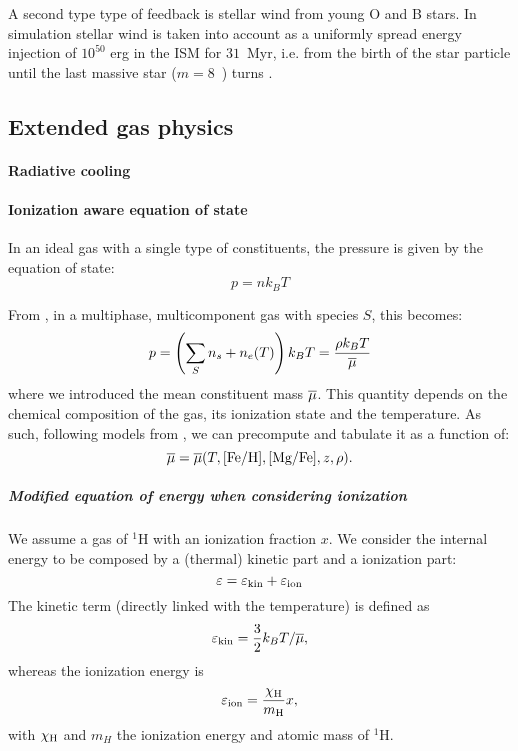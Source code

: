 A second type type of feedback is stellar wind from young O and B stars.
In simulation stellar wind is taken into account as a uniformly spread energy injection of $10^{50}$ erg in the ISM for $31$~Myr, i.e. from the birth of the star particle until the last massive star ($m = 8$~\Msun) turns \snii{}.



\subsection{Extended gas physics}
\label{sec:extended_gas_physics}
\paragraph{Radiative cooling}

\paragraph{Ionization aware equation of state}
In an ideal gas with a single type of constituents, the pressure is given by the equation of state:
\begin{equation}
p = n k_B T
\end{equation}

From \citep[p. 161]{Vandenbroucke2016}, in a multiphase, multicomponent gas with species $S$, this becomes:
\begin{equation}
p = \left(\sum_S n_s + n_e(T)\right) k_BT =\frac{\rho k_B T}{\overline{\mu}}
\end{equation}
where we introduced the mean constituent mass $\overline{\mu}$.
This quantity depends on the chemical composition of the gas, its ionization state and the temperature.
As such, following models from \citet{DeRijcke2013}, we can precompute and tabulate it as a function of:
\[\overline{\mu} = \overline{\mu}(T, [\text{Fe}/\text{H}], [\text{Mg}/\text{Fe}], z, \rho).\]

\subparagraph{Modified equation of energy when considering ionization}
We assume a gas of ${}^1$H with an ionization fraction $x$.
We consider the internal energy to be composed by a (thermal) kinetic part and a ionization part:
\begin{equation}
\label{eq:energy}
\varepsilon = \varepsilon_\text{kin} + \varepsilon_\text{ion}
\end{equation}
The kinetic term (directly linked with the temperature) is defined as
\begin{equation}
\varepsilon_\text{kin} = \frac 3 2 k_B T/ \overline{\mu}, 
\end{equation}
whereas the ionization energy is
\begin{equation}
\label{eq:energy_ion}
\varepsilon_\text{ion} = \dfrac{\chi_\text H}{m_\text H} x,
\end{equation}
with $\chi_\text H$ and $m_H$ the ionization energy and atomic mass of ${}^1$H.


